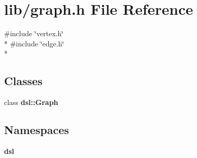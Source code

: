 \section{lib/graph.h File Reference}
\label{graph_8h}
{\ttfamily \#include \char`\"{}vertex.\-h\char`\"{}}\\*
{\ttfamily \#include \char`\"{}edge.\-h\char`\"{}}\\*
\subsection*{Classes}
\begin{DoxyCompactItemize}
\item 
class {\bf dsl\-::\-Graph}
\end{DoxyCompactItemize}
\subsection*{Namespaces}
\begin{DoxyCompactItemize}
\item 
{\bf dsl}
\end{DoxyCompactItemize}
